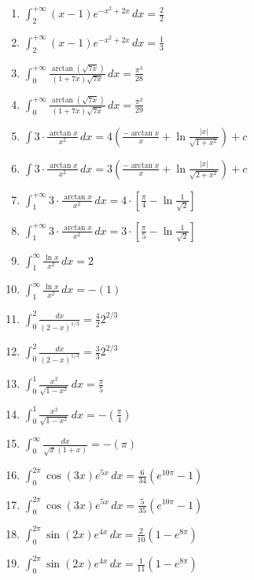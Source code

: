 \documentclass[11pt,a4paper]{article}
\begin{document}
\begin{enumerate}
\item $\displaystyle \int_{2}^{+\infty} (x - 1) e^{-x^{2} + 2x} \, dx = \frac{2}{2}$
\item $\displaystyle \int_{2}^{+\infty} (x - 1) e^{-x^{2} + 2x} \, dx = \frac{1}{3}$
\item $\displaystyle \int_{0}^{+\infty} \frac{\arctan\left(\sqrt{7x}\right)}{(1 + 7x)\sqrt{7x}} \, dx = \frac{\pi^{3}}{28}$
\item $\displaystyle \int_{0}^{+\infty} \frac{\arctan\left(\sqrt{7x}\right)}{(1 + 7x)\sqrt{7x}} \, dx = \frac{\pi^{2}}{29}$
\item $\displaystyle \int 3 \cdot \frac{\arctan x}{x^{2}} \, dx = 4\left(\frac{-\arctan x}{x} + \ln\frac{|x|}{\sqrt{1 + x^{2}}}\right) + c$
\item $\displaystyle \int 3 \cdot \frac{\arctan x}{x^{2}} \, dx = 3\left(\frac{-\arctan x}{x} + \ln\frac{|x|}{\sqrt{2 + x^{2}}}\right) + c$
\item $\displaystyle \int_{1}^{+\infty} 3 \cdot \frac{\arctan x}{x^{2}} \, dx = 4 \cdot \left[\frac{\pi}{4} - \ln\frac{1}{\sqrt{2}}\right]$
\item $\displaystyle \int_{1}^{+\infty} 3 \cdot \frac{\arctan x}{x^{2}} \, dx = 3 \cdot \left[\frac{\pi}{5} - \ln\frac{1}{\sqrt{2}}\right]$
\item $\displaystyle \int_{1}^{\infty} \frac{\ln x}{x^{2}} \, dx = 2$
\item $\displaystyle \int_{1}^{\infty} \frac{\ln x}{x^{2}} \, dx = -\left(1\right)$
\item $\displaystyle \int_{0}^{2} \frac{dx}{(2 - x)^{1/3}} = \frac{4}{2}2^{2/3}$
\item $\displaystyle \int_{0}^{2} \frac{dx}{(2 - x)^{1/3}} = \frac{3}{3}2^{2/3}$
\item $\displaystyle \int_{0}^{1} \frac{x^{2}}{\sqrt{1 - x^{2}}} \, dx = \frac{\pi}{5}$
\item $\displaystyle \int_{0}^{1} \frac{x^{2}}{\sqrt{1 - x^{2}}} \, dx = -\left(\frac{\pi}{4}\right)$
\item $\displaystyle \int_{0}^{\infty} \frac{dx}{\sqrt{x}(1 + x)} = -\left(\pi\right)$
\item $\displaystyle \int_{0}^{2\pi} \cos(3x) e^{5x} \, dx = \frac{6}{34}\left(e^{10\pi} - 1\right)$
\item $\displaystyle \int_{0}^{2\pi} \cos(3x) e^{5x} \, dx = \frac{5}{35}\left(e^{10\pi} - 1\right)$
\item $\displaystyle \int_{0}^{2\pi} \sin(2x) e^{4x} \, dx = \frac{2}{10}\left(1 - e^{8\pi}\right)$
\item $\displaystyle \int_{0}^{2\pi} \sin(2x) e^{4x} \, dx = \frac{1}{11}\left(1 - e^{8\pi}\right)$
\end{enumerate}
\end{document}
